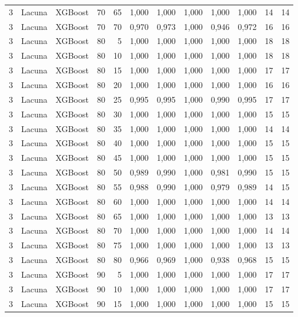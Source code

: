 \begin{longtable}{@{}rllrrrrrrrrr@{}}
3 & Lacuna & XGBoost & 70 & 65 & 1,000 & 1,000 & 1,000 & 1,000 & 1,000 & 14 & 14 \\
3 & Lacuna & XGBoost & 70 & 70 & 0,970 & 0,973 & 1,000 & 0,946 & 0,972 & 16 & 16 \\
3 & Lacuna & XGBoost & 80 & 5 & 1,000 & 1,000 & 1,000 & 1,000 & 1,000 & 18 & 18 \\
3 & Lacuna & XGBoost & 80 & 10 & 1,000 & 1,000 & 1,000 & 1,000 & 1,000 & 18 & 18 \\
3 & Lacuna & XGBoost & 80 & 15 & 1,000 & 1,000 & 1,000 & 1,000 & 1,000 & 17 & 17 \\
3 & Lacuna & XGBoost & 80 & 20 & 1,000 & 1,000 & 1,000 & 1,000 & 1,000 & 16 & 16 \\
3 & Lacuna & XGBoost & 80 & 25 & 0,995 & 0,995 & 1,000 & 0,990 & 0,995 & 17 & 17 \\
3 & Lacuna & XGBoost & 80 & 30 & 1,000 & 1,000 & 1,000 & 1,000 & 1,000 & 15 & 15 \\
3 & Lacuna & XGBoost & 80 & 35 & 1,000 & 1,000 & 1,000 & 1,000 & 1,000 & 14 & 14 \\
3 & Lacuna & XGBoost & 80 & 40 & 1,000 & 1,000 & 1,000 & 1,000 & 1,000 & 15 & 15 \\
3 & Lacuna & XGBoost & 80 & 45 & 1,000 & 1,000 & 1,000 & 1,000 & 1,000 & 15 & 15 \\
3 & Lacuna & XGBoost & 80 & 50 & 0,989 & 0,990 & 1,000 & 0,981 & 0,990 & 15 & 15 \\
3 & Lacuna & XGBoost & 80 & 55 & 0,988 & 0,990 & 1,000 & 0,979 & 0,989 & 14 & 15 \\
3 & Lacuna & XGBoost & 80 & 60 & 1,000 & 1,000 & 1,000 & 1,000 & 1,000 & 14 & 14 \\
3 & Lacuna & XGBoost & 80 & 65 & 1,000 & 1,000 & 1,000 & 1,000 & 1,000 & 13 & 13 \\
3 & Lacuna & XGBoost & 80 & 70 & 1,000 & 1,000 & 1,000 & 1,000 & 1,000 & 14 & 14 \\
3 & Lacuna & XGBoost & 80 & 75 & 1,000 & 1,000 & 1,000 & 1,000 & 1,000 & 13 & 13 \\
3 & Lacuna & XGBoost & 80 & 80 & 0,966 & 0,969 & 1,000 & 0,938 & 0,968 & 15 & 15 \\
3 & Lacuna & XGBoost & 90 & 5 & 1,000 & 1,000 & 1,000 & 1,000 & 1,000 & 17 & 17 \\
3 & Lacuna & XGBoost & 90 & 10 & 1,000 & 1,000 & 1,000 & 1,000 & 1,000 & 17 & 17 \\
3 & Lacuna & XGBoost & 90 & 15 & 1,000 & 1,000 & 1,000 & 1,000 & 1,000 & 15 & 15 \\

\end{longtable}
